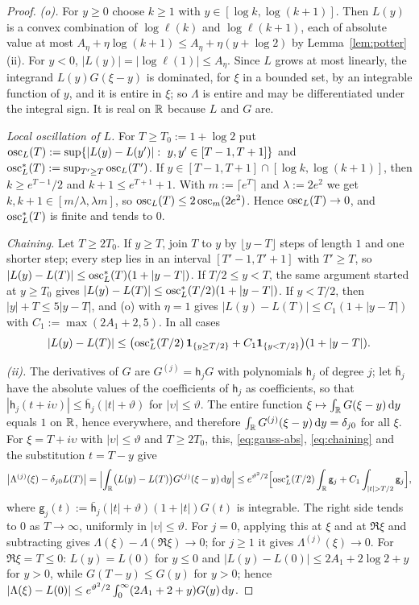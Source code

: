 \begin{proof}
\emph{(o).} For $y\ge0$ choose $k\ge1$ with $y\in[\log k,\log(k+1)]$. Then $L(y)$ is a convex combination of
$\log\ell(k)$ and $\log\ell(k+1)$, each of absolute value at most $A_\eta+\eta\log(k+1)\le A_\eta+\eta(y+\log2)$ by
Lemma~\ref{lem:potter}(ii). For $y<0$, $|L(y)|=|\log\ell(1)|\le A_\eta$. Since $L$ grows at most linearly, the integrand
$L(y)G(\xi-y)$ is dominated, for $\xi$ in a bounded set, by an integrable function of $y$, and it is entire in
$\xi$; so $\Lambda$ is entire and may be differentiated under the integral sign. It is real on $\mathbb{R}$ because $L$ and $G$
are.

\emph{Local oscillation of $L$.} For $T\ge T_0:=1+\log2$ put
$\osc_L(T):=\sup\{|L(y)-L(y')|:\ y,y'\in[T-1,T+1]\}$ and $\operatorname{osc}_L^*(T):=\sup_{T'\ge T}\operatorname{osc}_L(T')$. If
$y\in[T-1,T+1]\cap[\log k,\log(k+1)]$, then $k\ge e^{T-1}/2$ and $k+1\le e^{T+1}+1$. With $m:=\lceil e^T\rceil$ and
$\lambda:=2e^2$ we get $k,k+1\in[m/\lambda,\lambda m]$, so $\operatorname{osc}_L(T)\le2\operatorname{osc}_m(2e^2)$. Hence $\operatorname{osc}_L(T)\to0$, and
$\operatorname{osc}_L^*(T)$ is finite and tends to $0$.

\emph{Chaining.} Let $T\ge2T_0$. If $y\ge T$, join $T$ to $y$ by $\lfloor y-T\rfloor$ steps of length $1$ and one
shorter step; every step lies in an interval $[T'-1,T'+1]$ with $T'\ge T$, so $|L(y)-L(T)|\le\operatorname{osc}_L^*(T)(1+|y-T|)$.
If $T/2\le y<T$, the same argument started at $y\ge T_0$ gives $|L(y)-L(T)|\le\operatorname{osc}_L^*(T/2)(1+|y-T|)$. If $y<T/2$,
then $|y|+T\le5|y-T|$, and (o) with $\eta=1$ gives $|L(y)-L(T)|\le C_1(1+|y-T|)$ with $C_1:=\max(2A_1+2,5)$. In all
cases
\begin{equation}\label{eq:chaining}
  |L(y)-L(T)|\le\bigl(\operatorname{osc}_L^*(T/2)\,\mathbf 1_{\{y\ge T/2\}}+C_1\mathbf 1_{\{y<T/2\}}\bigr)(1+|y-T|).
\end{equation}

\emph{(ii).} The derivatives of $G$ are $G^{(j)}=\mathsf h_jG$ with polynomials $\mathsf h_j$ of degree $j$; let
$\bar{\mathsf h}_j$ have the absolute values of the coefficients of $\mathsf h_j$ as coefficients, so that
$|\mathsf h_j(t+i\upsilon)|\le\bar{\mathsf h}_j(|t|+\vartheta)$ for $|\upsilon|\le\vartheta$. The entire function
$\xi\mapsto\int_{\mathbb{R}} G(\xi-y)\,\mathrm{d} y$ equals $1$ on $\mathbb{R}$, hence everywhere, and therefore
$\int_{\mathbb{R}} G^{(j)}(\xi-y)\,\mathrm{d} y=\delta_{j0}$ for all $\xi$. For $\xi=T+i\upsilon$ with $|\upsilon|\le\vartheta$ and
$T\ge2T_0$, this, \eqref{eq:gauss-abs}, \eqref{eq:chaining} and the substitution $t=T-y$ give
\[
  \bigl|\Lambda^{(j)}(\xi)-\delta_{j0}L(T)\bigr|=\Bigl|\int_\R\bigl(L(y)-L(T)\bigr)G^{(j)}(\xi-y)\diff y\Bigr|
  \le e^{\vartheta^2/2}\Bigl[\osc_L^*(T/2)\int_\R\mathsf g_j+C_1\int_{|t|>T/2}\mathsf g_j\Bigr],
\]
where $\mathsf g_j(t):=\bar{\mathsf h}_j(|t|+\vartheta)(1+|t|)G(t)$ is integrable. The right side tends to $0$ as
$T\to\infty$, uniformly in $|\upsilon|\le\vartheta$. For $j=0$, applying this at $\xi$ and at $\Re\xi$ and subtracting
gives $\Lambda(\xi)-\Lambda(\Re\xi)\to0$; for $j\ge1$ it gives $\Lambda^{(j)}(\xi)\to0$. For $\Re\xi=T\le0$: $L(y)=L(0)$
for $y\le0$ and $|L(y)-L(0)|\le2A_1+2\log2+y$ for $y>0$, while $G(T-y)\le G(y)$ for $y>0$; hence
$|\Lambda(\xi)-L(0)|\le e^{\vartheta^2/2}\int_0^\infty(2A_1+2+y)G(y)\,\mathrm{d} y$.


\end{proof}
